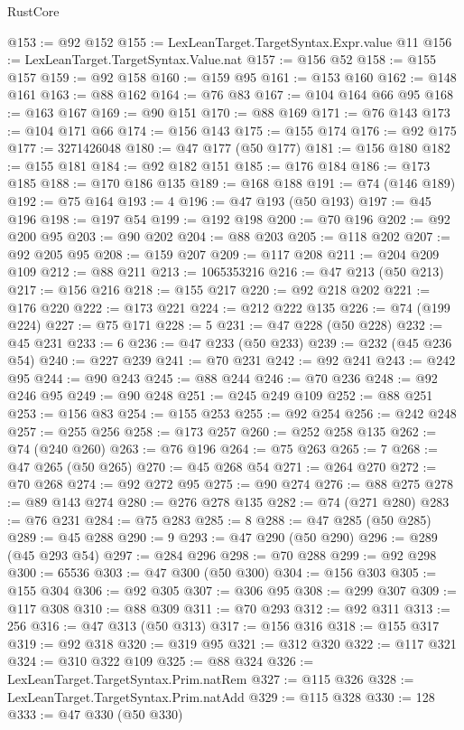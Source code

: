 \begin{lexlean}{RustCore}
\begin{coremodule}
@153 := @92 @152
@155 := LexLeanTarget.TargetSyntax.Expr.value @11
@156 := LexLeanTarget.TargetSyntax.Value.nat
@157 := @156 @52
@158 := @155 @157
@159 := @92 @158
@160 := @159 @95
@161 := @153 @160
@162 := @148 @161
@163 := @88 @162
@164 := @76 @83
@167 := @104 @164 @66 @95
@168 := @163 @167
@169 := @90 @151
@170 := @88 @169
@171 := @76 @143
@173 := @104 @171 @66
@174 := @156 @143
@175 := @155 @174
@176 := @92 @175
@177 := 3271426048
@180 := @47 @177 (@50 @177)
@181 := @156 @180
@182 := @155 @181
@184 := @92 @182 @151
@185 := @176 @184
@186 := @173 @185
@188 := @170 @186 @135
@189 := @168 @188
@191 := @74 (@146 @189)
@192 := @75 @164
@193 := 4
@196 := @47 @193 (@50 @193)
@197 := @45 @196
@198 := @197 @54
@199 := @192 @198
@200 := @70 @196
@202 := @92 @200 @95
@203 := @90 @202
@204 := @88 @203
@205 := @118 @202
@207 := @92 @205 @95
@208 := @159 @207
@209 := @117 @208
@211 := @204 @209 @109
@212 := @88 @211
@213 := 1065353216
@216 := @47 @213 (@50 @213)
@217 := @156 @216
@218 := @155 @217
@220 := @92 @218 @202
@221 := @176 @220
@222 := @173 @221
@224 := @212 @222 @135
@226 := @74 (@199 @224)
@227 := @75 @171
@228 := 5
@231 := @47 @228 (@50 @228)
@232 := @45 @231
@233 := 6
@236 := @47 @233 (@50 @233)
@239 := @232 (@45 @236 @54)
@240 := @227 @239
@241 := @70 @231
@242 := @92 @241
@243 := @242 @95
@244 := @90 @243
@245 := @88 @244
@246 := @70 @236
@248 := @92 @246 @95
@249 := @90 @248
@251 := @245 @249 @109
@252 := @88 @251
@253 := @156 @83
@254 := @155 @253
@255 := @92 @254
@256 := @242 @248
@257 := @255 @256
@258 := @173 @257
@260 := @252 @258 @135
@262 := @74 (@240 @260)
@263 := @76 @196
@264 := @75 @263
@265 := 7
@268 := @47 @265 (@50 @265)
@270 := @45 @268 @54
@271 := @264 @270
@272 := @70 @268
@274 := @92 @272 @95
@275 := @90 @274
@276 := @88 @275
@278 := @89 @143 @274
@280 := @276 @278 @135
@282 := @74 (@271 @280)
@283 := @76 @231
@284 := @75 @283
@285 := 8
@288 := @47 @285 (@50 @285)
@289 := @45 @288
@290 := 9
@293 := @47 @290 (@50 @290)
@296 := @289 (@45 @293 @54)
@297 := @284 @296
@298 := @70 @288
@299 := @92 @298
@300 := 65536
@303 := @47 @300 (@50 @300)
@304 := @156 @303
@305 := @155 @304
@306 := @92 @305
@307 := @306 @95
@308 := @299 @307
@309 := @117 @308
@310 := @88 @309
@311 := @70 @293
@312 := @92 @311
@313 := 256
@316 := @47 @313 (@50 @313)
@317 := @156 @316
@318 := @155 @317
@319 := @92 @318
@320 := @319 @95
@321 := @312 @320
@322 := @117 @321
@324 := @310 @322 @109
@325 := @88 @324
@326 := LexLeanTarget.TargetSyntax.Prim.natRem
@327 := @115 @326
@328 := LexLeanTarget.TargetSyntax.Prim.natAdd
@329 := @115 @328
@330 := 128
@333 := @47 @330 (@50 @330)

\end{coremodule}
\end{lexlean}

